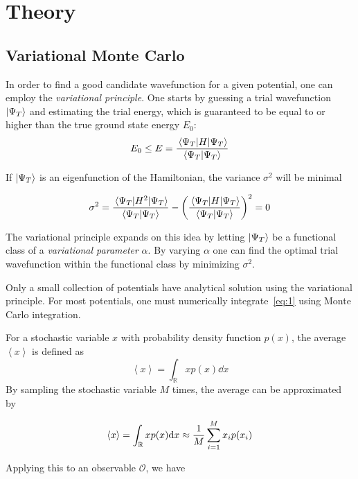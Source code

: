 \section{Theory}\label{sec:Theory}
\subsection{Variational Monte Carlo}
In order to find a good candidate wavefunction for a given potential, one can
employ the \textit{variational principle}. One starts by guessing a trial
wavefunction \(\ket{\Psi_{T}}\) and estimating the trial energy, which is
guaranteed to be equal to or higher than the true ground state energy \(E_{0}\):
\begin{equation}
  \label{eq:1}
  E_{0} \le E = \frac{\ev{H}{\Psi_{T}}}{\ip{\Psi_{T}}}
\end{equation}

If \(\ket{\Psi_{T}}\) is an eigenfunction of the Hamiltonian, the variance
\(\sigma^{2}\) will be minimal

\begin{equation*}
  \sigma^{2} = \frac{\ev{H^{2}}{\Psi_{T}}}{\ip{\Psi_{T}}} -\left( \frac{\ev{H}{\Psi_{T}}}{\ip{\Psi_{T}}} \right)^{2} = 0
\end{equation*}

The variational principle expands on this idea by letting \(\ket{\Psi_{T}}\) be
a functional class of a \textit{variational parameter} \(\alpha\). By varying
\(\alpha\) one can find the optimal trial wavefunction within the functional
class by minimizing \(\sigma^{2}\). 

Only a small collection of potentials have analytical solution using the
variational principle. For most potentials, one must numerically
integrate~\eqref{eq:1} using Monte Carlo integration.

For a stochastic variable \(x\) with probability density function \(p(x)\), the
average \(\left< x \right>\) is defined as
\begin{equation*}
  \left< x \right> = \int_{\mathbb{R}} xp(x)\dd x
\end{equation*}
By sampling the stochastic variable \(M\) times, the average can be approximated
by 

\begin{equation*}
  \expval{x} = \int_{\mathbb{R}} xp(x)\dd x \approx \frac{1}{M}\sum_{i=1}^{M}x_{i}p(x_{i})
\end{equation*}

Applying this to an observable \(\mathcal{O}\), we have

